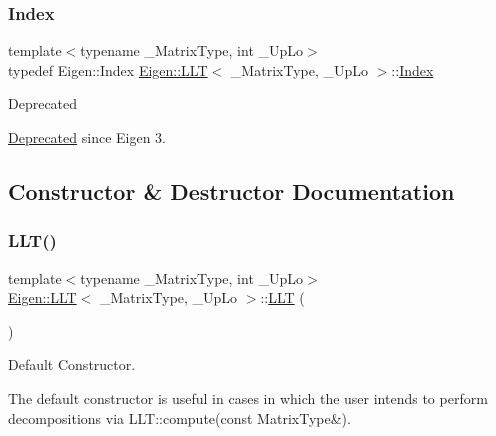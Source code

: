 \subsubsection{\texorpdfstring{Index}{Index}}
{\footnotesize\ttfamily template$<$typename \+\_\+\+Matrix\+Type, int \+\_\+\+Up\+Lo$>$ \\
typedef Eigen\+::\+Index \mbox{\hyperlink{class_eigen_1_1_l_l_t}{Eigen\+::\+L\+LT}}$<$ \+\_\+\+Matrix\+Type, \+\_\+\+Up\+Lo $>$\+::\mbox{\hyperlink{class_eigen_1_1_l_l_t_ac7a64274814fa76e8b1e9e945546037f}{Index}}}

\begin{DoxyRefDesc}{Deprecated}
\item[\mbox{\hyperlink{deprecated__deprecated000002}{Deprecated}}]since Eigen 3. \end{DoxyRefDesc}


\subsection{Constructor \& Destructor Documentation}
\mbox{\label{class_eigen_1_1_l_l_t_a16d1ec9ea6497ba1febb242c2e8a7a96}} 
\subsubsection{\texorpdfstring{LLT()}{LLT()}\hspace{0.1cm}{\footnotesize\ttfamily [1/3]}}
{\footnotesize\ttfamily template$<$typename \+\_\+\+Matrix\+Type, int \+\_\+\+Up\+Lo$>$ \\
\mbox{\hyperlink{class_eigen_1_1_l_l_t}{Eigen\+::\+L\+LT}}$<$ \+\_\+\+Matrix\+Type, \+\_\+\+Up\+Lo $>$\+::\mbox{\hyperlink{class_eigen_1_1_l_l_t}{L\+LT}} (\begin{DoxyParamCaption}{ }\end{DoxyParamCaption})\hspace{0.3cm}{\ttfamily [inline]}}



Default Constructor. 

The default constructor is useful in cases in which the user intends to perform decompositions via L\+L\+T\+::compute(const Matrix\+Type\&). \mbox{\label{class_eigen_1_1_l_l_t_ab3656cfbdf38e03c57d5cf79bf8131b6}} 
